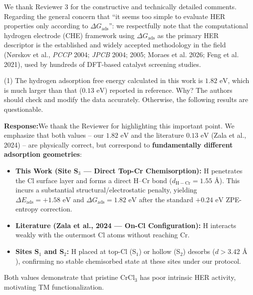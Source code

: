 \documentclass[11pt, sans, a4paper]{moderncv}
\newcommand{\response}{\vspace{0.4em}\noindent\textbf{\color{actionblue}Response:}\hspace{0.5em}}
\begin{document}
\vspace{0.5em}
\noindent We thank Reviewer 3 for the constructive and technically detailed comments. Regarding the general concern that ``it seems too simple to evaluate HER properties only according to $\Delta G_{\mathrm{ads}}$'': we respectfully note that the computational hydrogen electrode (CHE) framework using $\Delta G_{\mathrm{ads}}$ as the primary HER descriptor is the established and widely accepted methodology in the field (N{\o}rskov et al., \textit{PCCP} 2004; \textit{JPCB} 2004; 2005; Moraes et al. 2026; Feng et al. 2021), used by hundreds of DFT-based catalyst screening studies.

\vspace{1em}

\begin{reviewercomment}
(1) The hydrogen adsorption free energy calculated in this work is $1.82\text{ eV}$, which is much larger than that ($0.13\text{ eV}$) reported in reference. Why? The authors should check and modify the data accurately. Otherwise, the following results are questionable.
\end{reviewercomment}

\response We thank the Reviewer for highlighting this important point. We emphasize that both values -- our $1.82\text{ eV}$ and the literature $0.13\text{ eV}$ (Zala et al., 2024) -- are physically correct, but correspond to \textbf{fundamentally different adsorption geometries}:
\begin{itemize}[leftmargin=1.5em, itemsep=0.2em]
\item \textbf{This Work (Site S$_3$ --- Direct Top-Cr Chemisorption):} H penetrates the Cl surface layer and forms a direct H--Cr bond ($d_{\mathrm{H-Cr}} = 1.55\text{ \AA}$). This incurs a substantial structural/electrostatic penalty, yielding $\Delta E_{\mathrm{ads}} = +1.58\text{ eV}$ and $\Delta G_{\mathrm{ads}} = 1.82\text{ eV}$ after the standard $+0.24\text{ eV}$ ZPE-entropy correction.
\item \textbf{Literature (Zala et al., 2024 --- On-Cl Configuration):} H interacts weakly with the outermost Cl atoms without reaching Cr.
\item \textbf{Sites S$_1$ and S$_2$:} H placed at top-Cl (S$_1$) or hollow (S$_2$) desorbs ($d > 3.42\text{ \AA}$), confirming no stable chemisorbed state at these sites under our protocol.
\end{itemize}
Both values demonstrate that pristine CrCl$_3$ has poor intrinsic HER activity, motivating TM functionalization.
\end{document}
